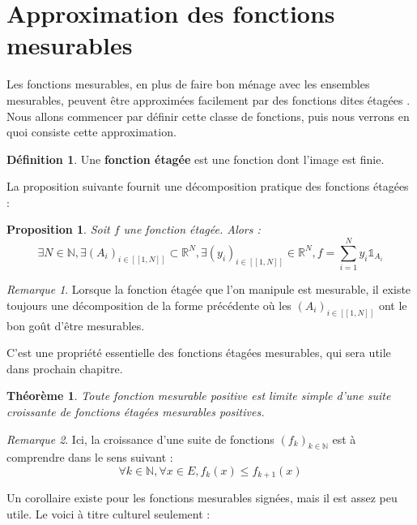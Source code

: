 \documentclass[french]{report}
\theoremstyle{plain}
\newtheorem{thm}{Théorème}[section]
\newtheorem{prop}{Proposition}[section]
\theoremstyle{definition}
\newtheorem{defi}{Définition}[section]
\theoremstyle{remark}
\newtheorem{rem}{Remarque}[section]
\begin{document}

\section{Approximation des fonctions mesurables}

Les fonctions mesurables, en plus de faire bon ménage avec les ensembles mesurables, peuvent être approximées facilement par des fonctions dites \og étagées \fg.
Nous allons commencer par définir cette classe de fonctions, puis nous verrons en quoi consiste cette approximation.

\begin{defi}
  Une \textbf{fonction étagée} est une fonction dont l'image est finie.
\end{defi}

La proposition suivante fournit une décomposition pratique des fonctions étagées :

\begin{prop}
  Soit $f$ une fonction étagée. Alors :
  $$
  \exists N \in \mathbb{N}, \exists \left(A_i\right)_{i \in [\![1,N]\!]} \subset \mathbb{R}^N, \exists \left(y_i\right)_{i \in [\![1,N]\!]} \in \mathbb{R}^N, f = \sum_{i=1}^{N}y_i\mathds{1}_{A_i}
  $$
\end{prop}

\begin{rem}
  Lorsque la fonction étagée que l'on manipule est mesurable, il existe toujours une décomposition de la forme précédente où les $\left(A_i\right)_{i\in[\![1,N]\!]}$ ont le bon goût d'être mesurables.

  C'est une propriété essentielle des fonctions étagées mesurables, qui sera utile dans prochain chapitre.
\end{rem}

\begin{thm}
  Toute fonction mesurable positive est limite simple d'une suite croissante de fonctions étagées mesurables positives.
\end{thm}

\begin{rem}
  Ici, la croissance d'une suite de fonctions $\left(f_k\right)_{k\in \mathbb{N}}$ est à comprendre dans le sens suivant :
  $$
  \forall k \in \mathbb{N}, \forall x \in E, f_k(x) \leq f_{k+1}(x)
  $$
\end{rem}

Un corollaire existe pour les fonctions mesurables signées, mais il est assez peu utile. Le voici à titre culturel seulement :
\end{document}
